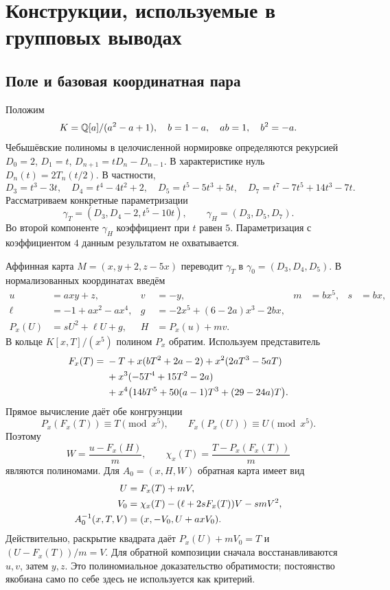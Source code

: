 \section{Конструкции, используемые в групповых выводах}\label{sec:constructions}

\subsection{Поле и базовая координатная пара}
Положим
\[
 K={\mathbb Q}[a]/(a^2-a+1),\quad b=1-a,\quad ab=1,\quad b^2=-a.
\]
Чебышёвские полиномы в целочисленной нормировке определяются рекурсией
$D_0=2$, $D_1=t$, $D_{n+1}=tD_n-D_{n-1}$. В характеристике нуль
$D_n(t)=2T_n(t/2)$. В частности,
\[
 D_3=t^3-3t,\quad D_4=t^4-4t^2+2,\quad D_5=t^5-5t^3+5t,
\quad D_7=t^7-7t^5+14t^3-7t.
\]
Рассматриваем конкретные параметризации
\[
 \gamma_T=(D_3,D_4-2,t^5-10t),\qquad
 \gamma_H=(D_3,D_5,D_7).
\]
Во второй компоненте $\gamma_H$ коэффициент при $t$ равен $5$.
Параметризация с коэффициентом $4$ данным результатом не охватывается.

Аффинная карта $M=(x,y+2,z-5x)$ переводит $\gamma_T$ в
$\gamma_0=(D_3,D_4,D_5)$. В нормализованных координатах введём
\begin{align*}
 u&=axy+z,&v&=-y,&m&=bx^5,&s&=bx,\\
 \ell&=-1+ax^2-ax^4,&
 g&=-2x^5+(6-2a)x^3-2bx,\\
 P_x(U)&=sU^2+\ell U+g,&H&=P_x(u)+mv.
\end{align*}
В кольце $K[x,T]/(x^5)$ полином $P_x$ обратим. Используем представитель
\begin{align}
 F_x(T)={}&-T+x(bT^2+2a-2)+x^2(2aT^3-5aT)\notag\\
 &+x^3(-5T^4+15T^2-2a)\notag\\
 &+x^4\bigl(14bT^5+50(a-1)T^3+(29-24a)T\bigr).
 \label{eq:inverse-mod-five}
\end{align}
Прямое вычисление даёт обе конгруэнции
\[
 P_x(F_x(T))\equiv T\pmod{x^5},\qquad
 F_x(P_x(U))\equiv U\pmod{x^5}.
\]
Поэтому
\[
 W=\frac{u-F_x(H)}m,\qquad
 \chi_x(T)=\frac{T-P_x(F_x(T))}m
\]
являются полиномами. Для $A_0=(x,H,W)$ обратная карта имеет вид
\begin{align}
 U&=F_x(T)+mV,\notag\\
 V_0&=\chi_x(T)-(\ell+2sF_x(T))V-smV^2,\notag\\
 A_0^{-1}(x,T,V)&=(x,-V_0,U+axV_0).\label{eq:base-inverse}
\end{align}
Действительно, раскрытие квадрата даёт $P_x(U)+mV_0=T$ и
$(U-F_x(T))/m=V$. Для обратной композиции сначала восстанавливаются
$u,v$, затем $y,z$. Это полиномиальное доказательство обратимости;
постоянство якобиана само по себе здесь не используется как критерий.

